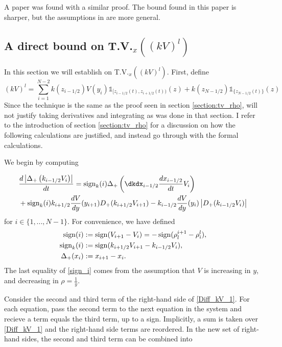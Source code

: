 \begin{remark}
	A paper was found with a similar proof. The bound found in this paper is sharper, but the assumptions in \cite{1078-0947_2020_1_233} are more general. 
\end{remark}

\subsection{A direct bound on T.V.$_x(\left(kV\right)^l)$} \label{subsection:bound_TV_kv}

In this section we will establish on T.V.$_x(\left(kV\right)^l)$. First, define 
\begin{equation}
\left(kV\right)^l = \sum_{i=1}^{N-2} k(z_{i-1/2})V(y_i)\mathbb{1}_{[z_{i - 1/2}(t), z_{i + 1/2}(t))}(z) + k(z_{N-1/2})\mathbb{1}_{\{z_{N - 1/2}(t)\}}(z)
\end{equation}
Since the technique is the same as the proof seen in section \eqref{section:tv_rho}, will not justify taking derivatives and integrating as was done in that section. I refer to the introduction of section \eqref{section:tv_rho} for a discussion on how the following calculations are justified, and instead go through with the formal calculations. 

We begin by computing 


\begin{align} \label{local_TV_kv_deriv}
	&\frac{d \left| \Delta_+\left(k_{i-1/2}V_{i}\right) \right|}{dt}=
	\sgn_k(i) \Delta_+\left(\dkdx_{i-1/2} \frac{dx_{i-1/2}}{dt} V_{i}\right) \nonumber\\
	&+ \sgn_k(i) k_{i+1/2} \frac{dV}{dy}(y_{i+1}) D_+(k_{i+1/2}V_{i+1}) - k_{i-1/2} \frac{dV}{dy}(y_i) \left|D_+(k_{i-1/2}V_{i})\right| \label{Diff_kV_1}
\end{align}
for $i \in \{1,...,N-1\}$. For convenience, we have defined 
\begin{align}
	\operatorname{sign}(i) &:= \operatorname{sign}(V_{i+1} - V_i) = - \operatorname{sign}(\rho_l^{i+1} - \rho^l_i), \label{sign_i}\\
	\operatorname{sign}_k(i) &:= \operatorname{sign}(k_{i+1/2}V_{i+1} - k_{i-1/2}V_i), \\
	\Delta_+(x_i) &:= x_{i+1} - x_{i}. 
\end{align}
The last equality of \eqref{sign_i} comes from the assumption that $V$ is increasing in $y$, and decreasing in $\rho = \frac{1}{y}$.  

Consider the second and third term of the right-hand side of \eqref{Diff_kV_1}. For each equation, pass the second term to the next equation in the system and recieve a  term equals the third term, up to a sign.  Implicitly, a sum is taken over \eqref{Diff_kV_1} and the right-hand side terms are reordered. In the new set of right-hand sides, the second and third term can be combined into

